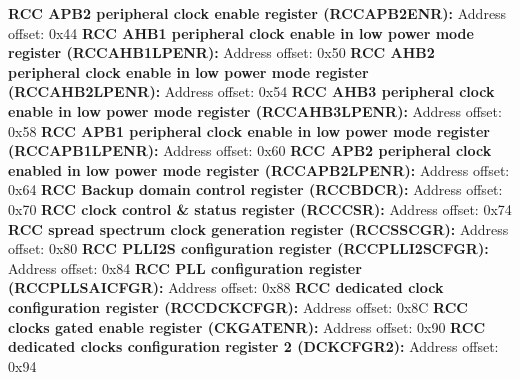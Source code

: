 \documentclass{article}
\begin{document}
\textbf{RCC APB2 peripheral clock enable register (RCC\textunderscore APB2ENR):} Address offset: 0x44\newline\newline
\textbf{RCC AHB1 peripheral clock enable in low power mode register (RCC\textunderscore AHB1LPENR):} Address offset: 0x50\newline\newline
\textbf{RCC AHB2 peripheral clock enable in low power mode register (RCC\textunderscore AHB2LPENR):} Address offset: 0x54\newline\newline
\textbf{RCC AHB3 peripheral clock enable in low power mode register (RCC\textunderscore AHB3LPENR):} Address offset: 0x58\newline\newline
\textbf{RCC APB1 peripheral clock enable in low power mode register (RCC\textunderscore APB1LPENR):} Address offset: 0x60\newline\newline
\textbf{RCC APB2 peripheral clock enabled in low power mode register (RCC\textunderscore APB2LPENR):} Address offset: 0x64\newline\newline
\textbf{RCC Backup domain control register (RCC\textunderscore BDCR):} Address offset: 0x70\newline\newline
\textbf{RCC clock control & status register (RCC\textunderscore CSR):} Address offset: 0x74\newline\newline
\textbf{RCC spread spectrum clock generation register (RCC\textunderscore SSCGR):} Address offset: 0x80\newline\newline
\textbf{RCC PLLI2S configuration register (RCC\textunderscore PLLI2SCFGR):} Address offset: 0x84\newline\newline
\textbf{RCC PLL configuration register (RCC\textunderscore PLLSAICFGR):} Address offset: 0x88\newline\newline
\textbf{RCC dedicated clock configuration register (RCC\textunderscore DCKCFGR):} Address offset: 0x8C\newline\newline
\textbf{RCC clocks gated enable register (CKGATENR):} Address offset: 0x90\newline\newline
\textbf{RCC dedicated clocks configuration register 2 (DCKCFGR2):} Address offset: 0x94\newline\newline
\end{document}
